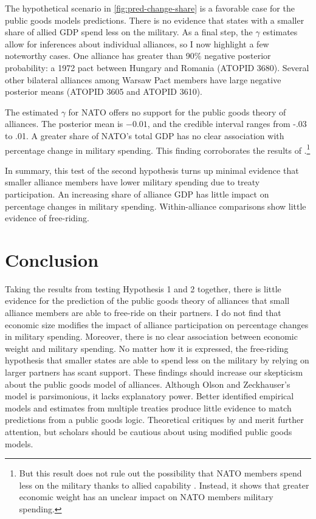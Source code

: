 \documentclass[12pt]{article}
\begin{document}
The hypothetical scenario in \autoref{fig:pred-change-share} is a favorable case for the public goods models predictions. 
There is no evidence that states with a smaller share of allied GDP spend less on the military. 
As a final step, the $\gamma$ estimates allow for inferences about individual alliances, so I now highlight a few noteworthy cases. 
One alliance has greater than 90\% negative posterior probability: a 1972 pact between Hungary and Romania (ATOPID 3680). 
Several other bilateral alliances among Warsaw Pact members have large negative posterior means (ATOPID 3605 and ATOPID 3610). 

 
The estimated $\gamma$ for NATO offers no support for the public goods theory of alliances. 
The posterior mean is $-0.01$, and the credible interval ranges from -.03 to .01.  
A greater share of NATO's total GDP has no clear association with percentage change in military spending. 
This finding corroborates the results of \citet{PluemperNeumayer2015}.\footnote{But this result does not rule out the possibility that NATO members spend less on the military thanks to allied capability \citep{GeorgeSandler2017}. Instead, it shows that greater economic weight has an unclear impact on NATO members military spending.}


In summary, this test of the second hypothesis turns up minimal evidence that smaller alliance members have lower military spending due to treaty participation. 
An increasing share of alliance GDP has little impact on percentage changes in military spending. 
Within-alliance comparisons show little evidence of free-riding.  


\section{Conclusion}

Taking the results from testing Hypothesis 1 and 2 together, there is little evidence for the prediction of the public goods theory of alliances that small alliance members are able to free-ride on their partners. 
I do not find that economic size modifies the impact of alliance participation on percentage changes in military spending.
Moreover, there is no clear association between economic weight and military spending. 
No matter how it is expressed, the free-riding hypothesis that smaller states are able to spend less on the military by relying on larger partners has scant support. 
These findings should increase our skepticism about the public goods model of alliances. 
Although Olson and Zeckhauser's model is parsimonious, it lacks explanatory power. 
Better identified empirical models and estimates from multiple treaties produce little evidence to match predictions from a public goods logic. 
Theoretical critiques by \citet{Palmer1990} and \citet{SandlerHartley2001} merit further attention, but scholars should be cautious about using modified public goods models. 
\end{document}
